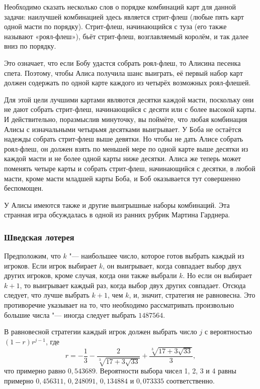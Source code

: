 \documentclass[twoside]{book}
\begin{document}
Необходимо сказать несколько слов о порядке комбинаций карт для данной задачи: наилучшей комбинацией здесь является стрит-флеш (любые пять карт одной масти по порядку).
Стрит-флеш, начинающийся с туза (его также называют «роял-флеш»), бьёт стрит-флеш, возглавляемый королём, и так далее вниз по порядку.

Это означает, что если Бобу удастся собрать роял-флеш, то Алисина песенка спета.
Поэтому, чтобы Алиса получила шанс выиграть, её первый набор карт должен содержать по одной карте каждого из четырёх возможных роял-флешей.

Для этой цели лучшими картами являются десятки каждой масти, поскольку они не дают собрать стрит-флеш, начинающийся с десяти или с более высокой карты.
И действительно, поразмыслив минуточку, вы поймёте, что любая комбинация Алисы с изначальными четырьмя десятками выигрывает.
У Боба не остаётся надежды собрать стрит-флеш выше девятки.
Но чтобы не дать Алисе собрать роял-флеш, он должен взять по меньшей мере по одной карте выше десятки из каждой масти и не более одной карты ниже десятки.
Алиса же теперь может поменять четыре карты и собрать стрит-флеш, начинающийся с десятки, в любой масти, кроме масти младшей карты Боба,
и Боб оказывается тут совершенно беспомощен.
\heart

У Алисы имеются также и другие выигрышные наборы комбинаций.
Эта странная игра обсуждалась в одной из ранних рубрик Мартина Гарднера. 

\subsubsection*{Шведская лотерея}%

Предположим, что $k$ "--- наибольшее число, которое готов выбрать каждый из игроков.
Если игрок выбирает $k$, он выигрывает, когда совпадает выбор двух других игроков, кроме случая, когда они также выбрали $k$.
Но если он выбирает $k+1$, то выигрывает каждый раз, когда выбор двух других совпадает.
Отсюда следует, что лучше выбрать $k+1$, чем $k$, и, значит, стратегия не равновесна.
Это противоречие указывает на то, что необходимо рассматривать произвольно большие числа "--- иногда следует выбрать $1487564$.
\heart

В равновесной стратегии каждый игрок должен выбрать число $j$ с вероятностью $(1-r)r^{j-1}$, где\vspace {-\jot}
\[r = -\frac13-\frac2{\sqrt[3]{17+3\sqrt{33}}}+\frac{\sqrt[3]{17+3\sqrt{33}}}3,\]
что примерно равно $0{,}543689$.
Вероятности выбора чисел 1, 2, 3 и 4 равны примерно $0{,}456311$, $0{,}248091$, $0{,}134884$ и $0{,}073335$ соответственно.
\end{document}
